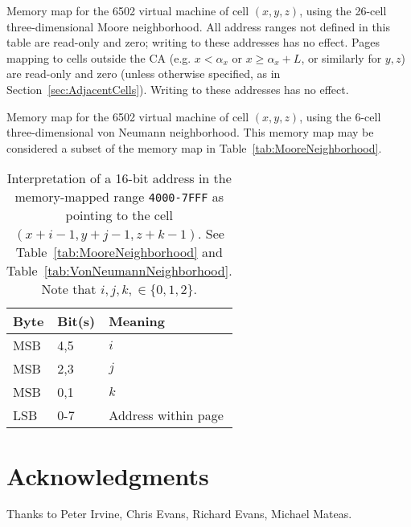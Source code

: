 \documentclass{article}
\newcommand\hex[1]{{\tt #1}}
\newcommand\hexrange[2]{\hex{#1}{\tt -}\hex{#2}}
\begin{document}
\begin{table}
\mooremap
\caption{
  \label{tab:MooreNeighborhood}
  Memory map for the 6502 virtual machine of cell $(x,y,z)$,
  using the 26-cell three-dimensional Moore neighborhood.
  All address ranges not defined in this table are read-only and zero;
  writing to these addresses has no effect.
  Pages mapping to cells outside the CA (e.g. $x<\alpha_x$ or $x \geq \alpha_x+L$, or similarly for $y,z$)
  are read-only and zero (unless otherwise specified, as in Section~\ref{sec:AdjacentCells}).
  Writing to these addresses has no effect.
}
\end{table}

\begin{table}
\vonneumannmap
\caption{
  \label{tab:VonNeumannNeighborhood}
  Memory map for the 6502 virtual machine of cell $(x,y,z)$,
  using the 6-cell three-dimensional von Neumann neighborhood.
  This memory map may be considered a subset of the memory map in Table~\ref{tab:MooreNeighborhood}.
}
\end{table}

\begin{table}
\begin{tabular}{lll}
  \hline
  Byte & Bit(s) & Meaning \\
  \hline
  MSB & 4,5 & $i$ \\
  MSB & 2,3 & $j$ \\
  MSB & 0,1 & $k$ \\
  LSB & 0-7 & Address within page \\
  \hline
\end{tabular}
\caption{
  Interpretation of a 16-bit address in the memory-mapped range \hexrange{4000}{7FFF}
  as pointing to the cell $(x+i-1,y+j-1,z+k-1)$.
  See Table~\ref{tab:MooreNeighborhood} and Table~\ref{tab:VonNeumannNeighborhood}.
  Note that $i,j,k, \in \{ 0,1,2 \}$.
  \label{tab:AddressBits}
}
\end{table}

\section*{Acknowledgments}
Thanks to Peter Irvine, Chris Evans, Richard Evans, Michael Mateas.



\end{document}
